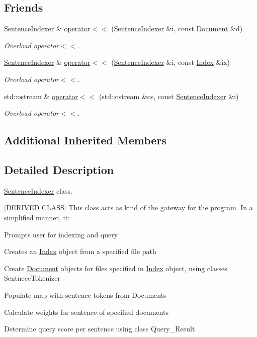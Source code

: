 \subsection*{Friends}
\begin{DoxyCompactItemize}
\item 
\hyperlink{class_sentence_indexer}{Sentence\+Indexer} \& \hyperlink{class_sentence_indexer_a30be5b0aa936deff7dc8763b554083ef}{operator$<$$<$} (\hyperlink{class_sentence_indexer}{Sentence\+Indexer} \&i, const \hyperlink{class_document}{Document} \&d)
\begin{DoxyCompactList}\small\item\em Overload operator$<$$<$. \end{DoxyCompactList}\item 
\hyperlink{class_sentence_indexer}{Sentence\+Indexer} \& \hyperlink{class_sentence_indexer_ae40f2c0786940505a8881ad209f2e892}{operator$<$$<$} (\hyperlink{class_sentence_indexer}{Sentence\+Indexer} \&i, const \hyperlink{class_index}{Index} \&ix)
\begin{DoxyCompactList}\small\item\em Overload operator$<$$<$. \end{DoxyCompactList}\item 
std\+::ostream \& \hyperlink{class_sentence_indexer_a8508e3ba7ddd0063c317c20295354e03}{operator$<$$<$} (std\+::ostream \&os, const \hyperlink{class_sentence_indexer}{Sentence\+Indexer} \&i)
\begin{DoxyCompactList}\small\item\em Overload operator$<$$<$. \end{DoxyCompactList}\end{DoxyCompactItemize}
\subsection*{Additional Inherited Members}


\subsection{Detailed Description}
\hyperlink{class_sentence_indexer}{Sentence\+Indexer} class. 

\mbox{[}D\+E\+R\+I\+V\+ED C\+L\+A\+SS\mbox{]} This class acts as kind of the gateway for the program. In a simplified manner, it\+:
\begin{DoxyItemize}
\item Prompts user for indexing and query
\item Creates an \hyperlink{class_index}{Index} object from a specified file path
\item Create \hyperlink{class_document}{Document} objects for files specified in \hyperlink{class_index}{Index} object, using classes Sentnece\+Tokenizer
\item Populate map with sentence tokens from Documents
\item Calculate weights for sentence of specified documents
\item Determine query score per sentence using class Query\+\_\+\+Result
\end{DoxyItemize}

